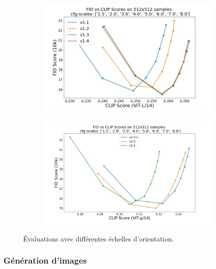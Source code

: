 \begin{figure}[H]
    \centering
    \begin{subfigure}[b]{0.49\textwidth}
        \centering
        \includegraphics[width=\textwidth]{./images/graph-sdv1.jpg}
        \caption{}
    \end{subfigure}
    \hfill
    \begin{subfigure}[b]{0.49\textwidth}
        \centering
        \includegraphics[width=\textwidth]{./images/graph-sdv2.jpg}
        \caption{}
    \end{subfigure}
    \caption{Évaluations avec différentes échelles d'orientation. \cite{rombach2021highresolution}}
    \label{fig:comparaison_sd}
\end{figure}


\subsubsection{Génération d'images}

